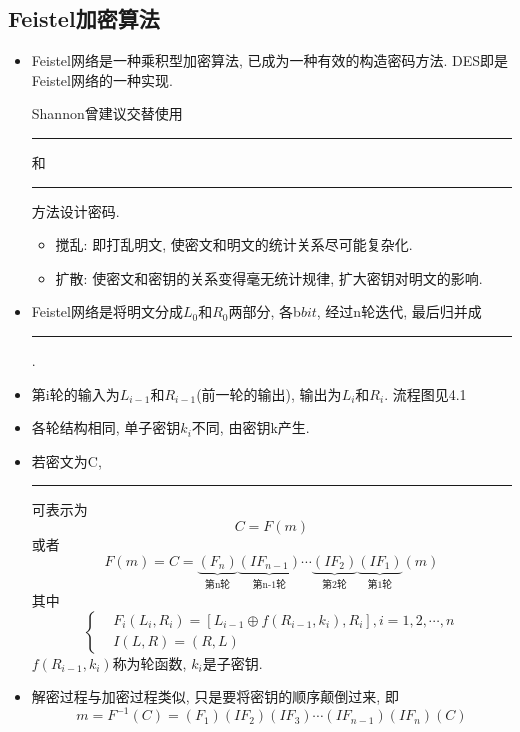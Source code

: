 \documentclass[UTF8]{ctexart}
\newcommand\hl{\bgroup\markoverwith
  {\textcolor{yellow}{\rule[-.5ex]{2pt}{2.5ex}}}\ULon}
\begin{document}
    \subsection{Feistel加密算法}
    \begin{itemize}
        \renewcommand{\labelitemi}{\scriptsize$\blacksquare$}
        \item Feistel网络是一种乘积型加密算法, 已成为一种有效的构造密码方法. DES即是Feistel网络的一种实现.

        Shannon曾建议交替使用\hl{搅乱}和\hl{扩散}方法设计密码.
        \begin{itemize}
            \item 搅乱: 即打乱明文, 使密文和明文的统计关系尽可能复杂化.
            \item 扩散: 使密文和密钥的关系变得毫无统计规律, 扩大密钥对明文的影响.
        \end{itemize}

        \item Feistel网络是将明文分成$L_0$和$R_0$两部分, 各b$bit$, 经过n轮迭代, 最后归并成\hl{密文块}.
        \item 第i轮的输入为$L_{i-1}$和$R_{i-1}$(前一轮的输出), 输出为$L_i$和$R_i$. 流程图见4.1
        \item 各轮结构相同, 单子密钥$k_i$不同, 由密钥k产生.
        \item 若密文为C, \hl{加密过程}可表示为
        $$C=F(m)$$
        或者
        $$F(m)=C=\underbrace{(F_n)}_{\mbox{第n轮}}\underbrace{(IF_{n-1})}_{\mbox{第n-1轮}}\cdots \underbrace{(IF_2)}_{\mbox{第2轮}}\underbrace{(IF_1)}_{\mbox{第1轮}}(m)$$
        其中
        $$
        \left\{ \begin{aligned}
            &F_i(L_i, R_i)=[L_{i-1}\oplus f(R_{i-1}, k_i), R_i], i=1,2,\cdots,n\\
            &I(L,R)=(R,L)
        \end{aligned}\right.
        $$
        $f(R_{i-1}, k_i)$称为轮函数, $k_i$是子密钥.
        \item 解密过程与加密过程类似, 只是要将密钥的顺序颠倒过来, 即
        $$m=F^{-1}(C)=(F_1)(IF_2)(IF_3)\cdots (IF_{n-1})(IF_n)(C)$$
    \end{itemize}
\end{document}
